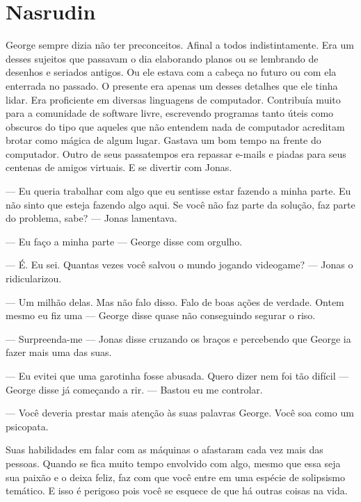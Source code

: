 \chapter{Nasrudin}

George sempre dizia não ter preconceitos. Afinal a todos indistintamente. Era um desses sujeitos que passavam o dia elaborando planos ou se lembrando de desenhos e seriados antigos. Ou ele estava com a cabeça no futuro ou com ela enterrada no passado. O presente era apenas um desses detalhes  que ele tinha  lidar. Era proficiente em diversas linguagens de computador. Contribuía muito para a comunidade de software livre, escrevendo programas tanto úteis como obscuros\mudanca{,} do tipo que aqueles que não entendem nada de computador acreditam brotar como mágica de algum lugar. Gastava um bom tempo na frente do computador. Outro de seus passatempos era repassar e-mails e piadas para seus centenas de amigos virtuais. E se divertir com Jonas.

--- Eu queria trabalhar com algo que eu sentisse estar fazendo a minha parte. Eu não sinto que esteja fazendo algo aqui. Se você não faz parte da solução, faz parte do problema, sabe? --- Jonas lamentava.

--- Eu faço a minha parte --- George disse\mudanca{,} com orgulho.

--- É. Eu sei. Quantas vezes você salvou o mundo jogando videogame? --- Jonas o ridicularizou.

--- Um milhão delas. Mas não falo disso. Falo de boas ações de verdade. Ontem mesmo eu fiz uma --- George disse\mudanca{,} quase não conseguindo segurar o riso.

--- Surpreenda-me --- Jonas disse\mudanca{,} cruzando os braços e percebendo que George ia fazer mais uma das suas.

--- Eu evitei que uma garotinha fosse abusada. Quero dizer\mudanca{,} nem foi tão difícil --- George disse\mudanca{,} já começando a rir. --- Bastou eu me controlar.

--- Você deveria prestar mais atenção às suas palavras George. Você soa como um psicopata.

Suas habilidades em falar com as máquinas o afastaram cada vez mais das pessoas. Quando se fica muito tempo envolvido com algo, mesmo que essa seja sua paixão e o deixa feliz, faz com que você entre em uma espécie de solipsismo temático. E isso é perigoso\mudanca{,} pois você se esquece de que há outras coisas na vida.

